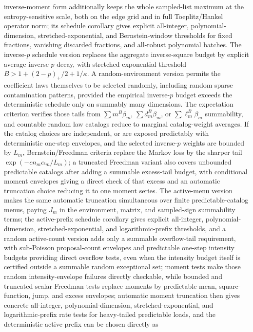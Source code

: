 \documentclass[11pt]{article}
\begin{document}
inverse-moment form additionally keeps the whole sampled-list maximum at the
entropy-sensitive scale, both on the edge grid and in full Toeplitz/Hankel
operator norm; its schedule corollary gives explicit all-integer,
polynomial-dimension, stretched-exponential, and Bernstein-window thresholds for
fixed fractions, vanishing discarded fractions, and all-robust polynomial
batches. The inverse-\(p\) schedule version replaces the aggregate inverse-square
budget by explicit average inverse-\(p\) decay, with stretched-exponential
threshold \(B>1+(2-p)_+/2+1/\kappa\). A random-environment version permits the
coefficient laws themselves to be selected randomly, including random sparse
contamination patterns, provided the empirical inverse-\(p\) budget exceeds the
deterministic schedule only on summably many dimensions. The expectation
criterion verifies those tails from \(\sum m^B\beta_m\),
\(\sum d_m^B\beta_m\), or \(\sum\ell_m^B\beta_m\) summability, and countable
random law catalogs reduce to marginal catalog-weight averages. If the catalog
choices are independent, or are exposed predictably with deterministic one-step
envelopes, and the selected inverse-\(p\) weights are bounded by \(L_m\),
Bernstein/Freedman criteria replace the Markov loss by the sharper tail
\(\exp(-c n_m\alpha_m/L_m)\); a truncated Freedman variant also covers
unbounded predictable catalogs after adding a summable excess-tail budget, with
conditional moment envelopes giving a direct check of that excess and an
automatic truncation choice reducing it to one moment series. The
active-menu version makes the same automatic truncation simultaneous over
finite predictable-catalog menus, paying \(J_m\) in the environment,
matrix, and sampled-sign summability terms; the active-prefix schedule
corollary gives explicit all-integer, polynomial-dimension,
stretched-exponential, and logarithmic-prefix thresholds, and a random
active-count version adds only a summable overflow-tail requirement, with
sub-Poisson proposal-count envelopes and predictable one-step intensity budgets
providing direct overflow tests, even when the intensity budget itself is
certified outside a summable random exceptional set; moment tests make those
random intensity-envelope failures directly checkable, while bounded and
truncated scalar Freedman tests replace moments by predictable mean,
square-function, jump, and excess envelopes; automatic moment truncation then
gives concrete all-integer, polynomial-dimension, stretched-exponential, and
logarithmic-prefix rate tests for heavy-tailed predictable loads, and the
deterministic active prefix can be chosen directly as
\end{document}
